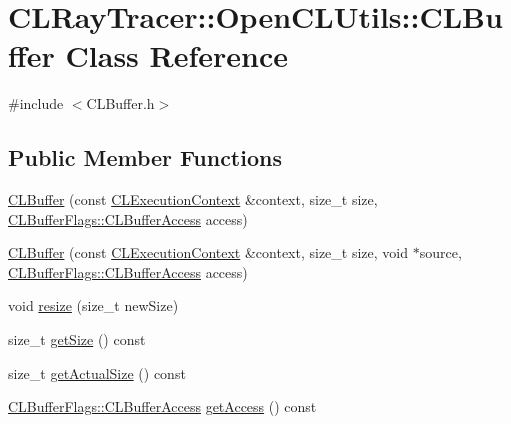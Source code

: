 \hypertarget{class_c_l_ray_tracer_1_1_open_c_l_utils_1_1_c_l_buffer}{}\section{C\+L\+Ray\+Tracer\+:\+:Open\+C\+L\+Utils\+:\+:C\+L\+Buffer Class Reference}
\label{class_c_l_ray_tracer_1_1_open_c_l_utils_1_1_c_l_buffer}


{\ttfamily \#include $<$C\+L\+Buffer.\+h$>$}

\subsection*{Public Member Functions}
\begin{DoxyCompactItemize}
\item 
\hyperlink{class_c_l_ray_tracer_1_1_open_c_l_utils_1_1_c_l_buffer_ab1c184568385b55a134656e303d333fc}{C\+L\+Buffer} (const \hyperlink{class_c_l_ray_tracer_1_1_open_c_l_utils_1_1_c_l_execution_context}{C\+L\+Execution\+Context} \&context, size\+\_\+t size, \hyperlink{_c_l_execution_context_8h_a354d4612d8d46b32eb5ad4a71f35694c}{C\+L\+Buffer\+Flags\+::\+C\+L\+Buffer\+Access} access)
\item 
\hyperlink{class_c_l_ray_tracer_1_1_open_c_l_utils_1_1_c_l_buffer_a9b9c5e69581dbc6ba85f309bf7f6a208}{C\+L\+Buffer} (const \hyperlink{class_c_l_ray_tracer_1_1_open_c_l_utils_1_1_c_l_execution_context}{C\+L\+Execution\+Context} \&context, size\+\_\+t size, void $\ast$source, \hyperlink{_c_l_execution_context_8h_a354d4612d8d46b32eb5ad4a71f35694c}{C\+L\+Buffer\+Flags\+::\+C\+L\+Buffer\+Access} access)
\item 
void \hyperlink{class_c_l_ray_tracer_1_1_open_c_l_utils_1_1_c_l_buffer_aaf79f25d32f359626fe3fb9682996411}{resize} (size\+\_\+t new\+Size)
\item 
size\+\_\+t \hyperlink{class_c_l_ray_tracer_1_1_open_c_l_utils_1_1_c_l_buffer_a003ca8fcdba1348bf69a53f7a9f74700}{get\+Size} () const 
\item 
size\+\_\+t \hyperlink{class_c_l_ray_tracer_1_1_open_c_l_utils_1_1_c_l_buffer_a741374ca2c85ccd3e5dfdccf861d1175}{get\+Actual\+Size} () const 
\item 
\hyperlink{_c_l_execution_context_8h_a354d4612d8d46b32eb5ad4a71f35694c}{C\+L\+Buffer\+Flags\+::\+C\+L\+Buffer\+Access} \hyperlink{class_c_l_ray_tracer_1_1_open_c_l_utils_1_1_c_l_buffer_a38e74df6a56d3f8975c396f6731183b9}{get\+Access} () const 

\end{DoxyCompactItemize}
